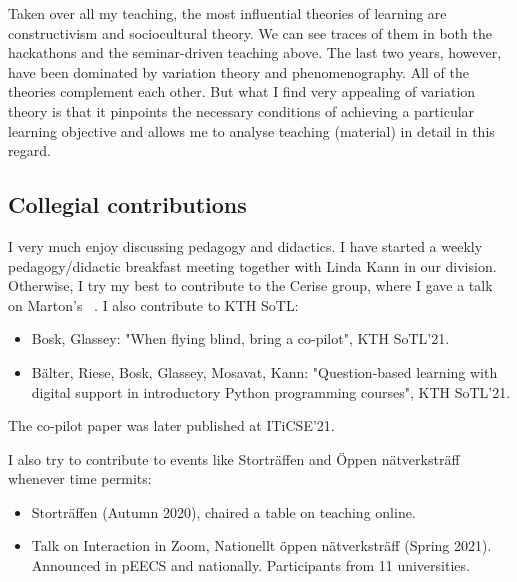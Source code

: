
Taken over all my teaching, the most influential theories of learning are 
constructivism and sociocultural theory.
We can see traces of them in both the hackathons and the seminar-driven 
teaching above.
The last two years, however, have been dominated by variation theory and 
phenomenography.
All of the theories complement each other.
But what I find very appealing of variation theory is that it pinpoints the 
necessary conditions of achieving a particular learning objective and allows me 
to analyse teaching (material) in detail in this regard.

\subsection{Collegial contributions}



I very much enjoy discussing pedagogy and didactics.
I have started a weekly pedagogy/didactic breakfast meeting together with Linda 
Kann in our division.
Otherwise, I try my best to contribute to the Cerise group, where I gave a talk 
on Marton's 
~\citeyear{NecessaryConditionsOfLearning}.
I also contribute to KTH SoTL:
\begin{itemize}
  \item Bosk, Glassey: "When flying blind, bring a co-pilot", KTH SoTL'21.

  \item Bälter, Riese, Bosk, Glassey, Mosavat, Kann: "Question-based learning 
    with digital support in introductory Python programming courses", KTH 
    SoTL'21.
\end{itemize}
The co-pilot paper was later published at ITiCSE'21.

I also try to contribute to events like Storträffen and Öppen nätverksträff 
whenever time permits:
\begin{itemize}
  \item Storträffen (Autumn 2020), chaired a table on teaching online.
  \item Talk on Interaction in Zoom, Nationellt öppen nätverksträff (Spring 
    2021). Announced in pEECS and nationally. Participants from 11 
    universities.
\end{itemize}

